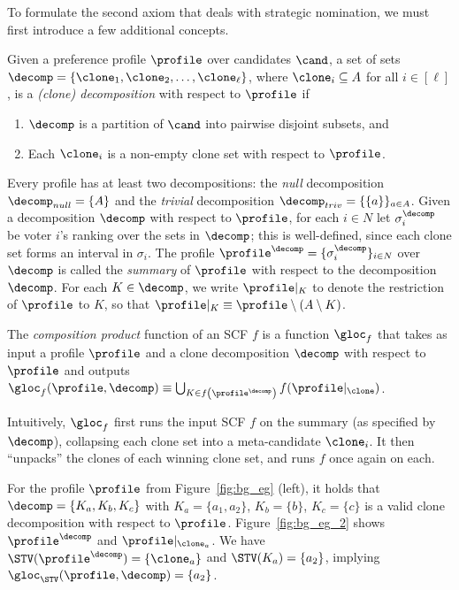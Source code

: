 To formulate the second axiom that deals with strategic nomination, we must first introduce a few additional concepts.
  \begin{definition}\label{def:clone_grouping}
Given a preference profile $\profile$ over candidates $\cand$, a set of sets $\decomp=\{\clone_1,\clone_2,\ldots,\clone_\ell\}$, where $\clone_i \subseteq A$ for all $i\in [\ell]$, is a \emph{(clone) decomposition} with respect to $\profile$ if
\begin{enumerate}
    \item $\decomp$ is a partition of $\cand$ into pairwise disjoint subsets, and
    \item Each $\clone_i$ is a non-empty clone set with respect to $\profile$.
\end{enumerate}
\end{definition}
Every profile has at least two decompositions: the \textit{null} decomposition $\decomp_{null}=\{A\}$ and the \textit{trivial} decomposition $\decomp_{triv}=\{ \{a\}\}_{a \in A}$. Given a decomposition $\decomp$ with respect to $\profile$, for each $i \in N$ let $\sigma^\decomp_i$ be voter $i$'s ranking over the sets in $\decomp$; this is well-defined, since each clone set forms an interval in $\sigma_i$. The profile $\profile^\decomp = \{\sigma^\decomp_i\}_{i \in N}$ over $\decomp$ is called the \textit{summary} of $\profile$ with respect to the decomposition $\decomp$. For each $K \in \decomp$, we write $\profile|_{K}$ to denote the restriction of $\profile$ to $K$, so that $\profile|_{K} \equiv \profile \setminus (A \setminus K)$. 

\begin{definition}\label{def:gloc} 
    The \emph{composition product} function of an SCF $f$ is a function $\gloc_f$ that takes as input a profile $\profile$ and a clone decomposition $\decomp$ with respect to $\profile$ and outputs $\gloc_f(\profile, \decomp) \equiv \bigcup_{K \in f\left(\profile^\decomp\right)  }f(\profile|_\clone)$.
\end{definition}

Intuitively, $\gloc_f$ first runs the input SCF $f$ on the summary (as specified by $\decomp$), collapsing each clone set into a meta-candidate $\clone_i$. It then ``unpacks'' the clones of each winning clone set, and runs $f$ once again on each.
\begin{example}\label{eg:GLOC}
    For the profile $\profile$ from Figure~\ref{fig:bg_eg} (left), it holds that $\decomp=\{K_a,K_b,K_c\}$ with $K_a=\{a_1,a_2\}$, $K_b=\{b\}$, $K_c=\{c\}$ is a valid clone decomposition with respect to $\profile$. Figure~\ref{fig:bg_eg_2} shows $\profile^\decomp$ and $\profile|_{\clone_a}$. We have $\STV(\profile^\decomp)=\{\clone_a\}$ and $\STV(K_a)=\{a_2\}$, implying $\gloc_{\STV}(\profile, \decomp) =\{a_2\}$.
\end{example}

